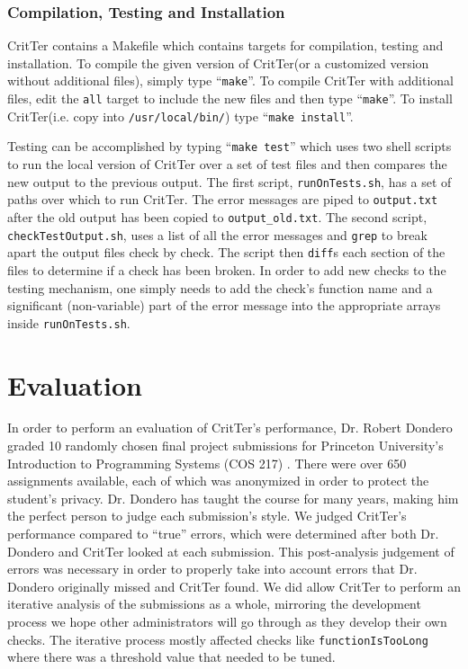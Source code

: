 \documentclass[12pt]{report}
\newcommand{\programName}{CritTer\xspace}
\begin{document}
\subsection{Compilation, Testing and Installation}

\programName contains a Makefile which contains targets for compilation, testing and installation. To 
compile the given version of \programName (or a customized version without additional files), simply 
type ``\lstinline{make}''. To compile \programName with additional files, edit the \lstinline{all} target to 
include the new files and then type ``\lstinline{make}''. To install \programName (i.e. copy into 
\lstinline{/usr/local/bin/}) type ``\lstinline{make install}''.

Testing can be accomplished by typing ``\lstinline{make test}'' which uses two shell scripts to run the 
local version of \programName over a set of test files and then compares the new output to the previous 
output. The first script, \lstinline{runOnTests.sh}, has a set of paths over which to run \programName. The 
error messages are piped to \lstinline{output.txt} after the old output has been copied to 
\lstinline{output_old.txt}. The second script, \lstinline{checkTestOutput.sh}, uses a list of all the error 
messages and \lstinline{grep} to break apart the output files check by check. The script then 
\lstinline{diff}s each section of the files to determine if a check has been broken. In order to add new 
checks to the testing mechanism, one simply needs to add the check's function name and a significant 
(non-variable) part of the error message into the appropriate arrays inside \lstinline{runOnTests.sh}.

\chapter{Evaluation}

\newcommand{\human}{Dr.\ Dondero\xspace}

In order to perform an evaluation of \programName's performance, Dr. Robert Dondero graded 
10 randomly chosen final project submissions for Princeton University's Introduction to Programming 
Systems (COS 217) \cite{cos217}. There were over 650 assignments available, each of which was 
anonymized in order to protect the student's privacy. Dr. Dondero has taught the course for many years, 
making him the perfect person to judge each submission's style. We judged \programName's 
performance compared to ``true'' errors, which were determined after both Dr. Dondero and 
\programName looked at each submission. This post-analysis judgement of errors was necessary in 
order to properly take into account errors that Dr. Dondero originally missed and  \programName found. 
We did allow \programName to perform an iterative analysis of the submissions as a whole, mirroring 
the development process we hope other administrators will go through as they develop their own 
checks. The iterative process mostly affected checks like \lstinline{functionIsTooLong} where there was a 
threshold value that needed to be tuned. 
\end{document}
